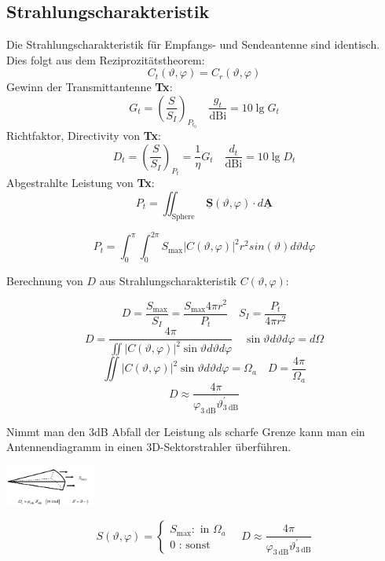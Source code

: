 \documentclass[english]{latex4ei/latex4ei_sheet}
\renewcommand{\vec}[1]{\underline{\boldsymbol{#1}}}
\begin{document}
\begin{sectionbox}
    \subsection{Strahlungscharakteristik}
    Die Strahlungscharakteristik für Empfangs- und Sendeantenne sind identisch. Dies folgt aus dem Reziprozitätstheorem:
    $$
        C_{t}(\vartheta, \varphi)=C_{r}(\vartheta, \varphi)
    $$
    Gewinn der Transmittantenne \textbf{Tx}:
    $$G_{t}=\left(\frac{S}{S_{I}}\right)_{P_{t_{0}}}
        \quad
        \frac{g_{t}}{\mathrm{dBi}}=10 \lg G_{t}
    $$
    Richtfaktor, Directivity von \textbf{Tx}:
    $$
        D_{t}=\left(\frac{S}{S_{I}}\right)_{P_{t}}=\frac{1}{\eta} G_{t}
        \quad
        \frac{d_{t}}{\mathrm{dBi}}=10 \lg D_{t}
    $$
    Abgestrahlte Leistung von \textbf{Tx}:
    $$
        P_{t}=\iint_{\text {Sphere }} \vec{S}(\vartheta, \varphi) \cdot d \vec{A}
    $$
    \begin{emphbox}
        $$
            P_{t}= \int_{0}^{\pi}\int_{0}^{2\pi} S_{\text{max}} |C(\vartheta, \varphi)|^2 r^2 sin(\vartheta) d\vartheta d\varphi
        $$
    \end{emphbox}
    Berechnung von $D$ aus Strahlungscharakteristik $C( \vartheta , \varphi)$:
    \begin{emphbox}
        $$
            D=\frac{S_{\max }}{S_{I}}=\frac{S_{\max } 4 \pi r^{2}}{P_{t}} \quad S_{I}=\frac{P_{t}}{4 \pi r^{2}}
        $$
        $$
            D=\frac{4 \pi}{\iint|C(\vartheta, \varphi)|^{2} \sin \vartheta d \vartheta d \varphi} \quad \sin \vartheta d \vartheta d \varphi=d \Omega$$
        $$ \iint|C(\vartheta, \varphi)|^{2} \sin \vartheta d \vartheta d \varphi=\Omega_{a}\quad
            D=\frac{4 \pi}{\Omega_{a}}
        $$
        $$
            D \approx \frac{4 \pi}{\varphi_{3 \mathrm{~dB}} \vartheta_{3 \mathrm{~dB}}^{\prime}}
        $$
    \end{emphbox}
\end{sectionbox}
\begin{sectionbox}
    Nimmt man den $3$dB Abfall der Leistung als scharfe Grenze kann man ein Antennendiagramm in einen 3D-Sektorstrahler überführen.
    \begin{center}
        \includegraphics[width = 3cm]{./img/antenne_3d_sektor.png}
    \end{center}

    \begin{emphbox}
        $$
            S(\vartheta, \varphi)=\left\{\begin{array}{c}
                S_{\max }: \text { in } \Omega_{a} \\
                0 \text { : sonst }
            \end{array}\right. \quad
            D \approx \frac{4 \pi}{\varphi_{3 \mathrm{~dB}} \vartheta_{3 \mathrm{~dB}}^{\prime}}
        $$
    \end{emphbox}
\end{sectionbox}
\end{document}
